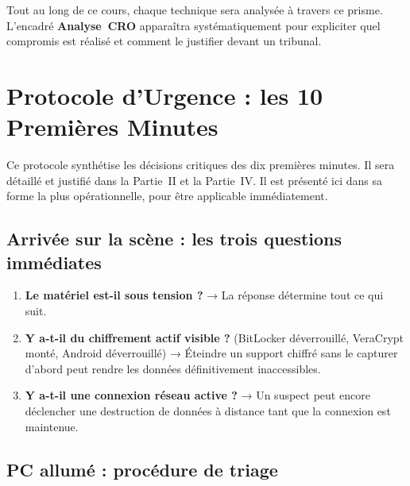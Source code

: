 \medskip

Tout au long de ce cours, chaque technique sera analysée à travers ce prisme.
L'encadré \textbf{Analyse~CRO} apparaîtra systématiquement pour expliciter
quel compromis est réalisé et comment le justifier devant un tribunal.

\section{Protocole d'Urgence : les 10 Premières Minutes}
\label{sec:protocole-urgence}

Ce protocole synthétise les décisions critiques des dix premières minutes.
Il sera détaillé et justifié dans la Partie~II et la Partie~IV. Il est
présenté ici dans sa forme la plus opérationnelle, pour être applicable
immédiatement.

\subsection{Arrivée sur la scène : les trois questions immédiates}

\begin{enumerate}
    \item \textbf{Le matériel est-il sous tension ?} → La réponse détermine
          tout ce qui suit.
    \item \textbf{Y a-t-il du chiffrement actif visible ?}
          (BitLocker déverrouillé, VeraCrypt monté, Android déverrouillé) →
          Éteindre un support chiffré sans le capturer d'abord peut rendre
          les données définitivement inaccessibles.
    \item \textbf{Y a-t-il une connexion réseau active ?} → Un suspect peut
          encore déclencher une destruction de données à distance tant que
          la connexion est maintenue.
\end{enumerate}

\subsection{PC allumé : procédure de triage}

